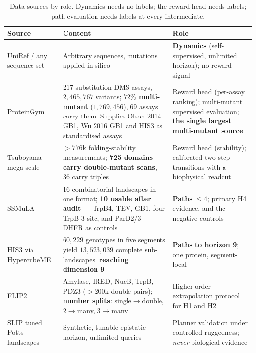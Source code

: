 \documentclass[12pt, a4paper]{article}
\begin{document}
\begin{table}[h]
\centering
\caption{Data sources by role. Dynamics needs no labels; the reward head needs labels; path evaluation needs labels at every intermediate.}
\label{tab:data}
\small
\begin{tabular}{p{4.0cm} p{4.8cm} p{4.6cm}}
\toprule
\textbf{Source} & \textbf{Content} & \textbf{Role} \\
\midrule
UniRef / any sequence set & Arbitrary sequences, mutations applied in silico & \textbf{Dynamics} (self-supervised, unlimited horizon); no reward signal \\
\addlinespace
ProteinGym \citep{notin2023proteingym} & 217 substitution DMS assays, $2{,}465{,}767$ variants; \textbf{$72\%$ multi-mutant} ($1{,}769{,}456$), 69 assays carry them. Supplies Olson 2014 GB1, Wu 2016 GB1 and HIS3 as standardised assays & Reward head (per-assay ranking); multi-mutant supervised evaluation; \textbf{the single largest multi-mutant source} \\
\addlinespace
Tsuboyama mega-scale \citep{tsuboyama2023megascale} & ${>}776$k folding-stability measurements; \textbf{725 domains carry double-mutant scans}, 36 carry triples & Reward head (stability); calibrated two-step transitions with a biophysical readout \\
\addlinespace
SSMuLA \citep{li2025ssmula} & 16 combinatorial landscapes in one format; \textbf{10 usable after audit} --- TrpB4, TEV, GB1, four TrpB 3-site, and ParD2/3 + DHFR as controls & \textbf{Paths} $\leq 4$; primary H4 evidence, and the negative controls \\
\addlinespace
HIS3 via HypercubeME \citep{pokusaeva2019his3, esteban2019hypercubeme} & $60{,}229$ genotypes in five segments yield $13{,}523{,}039$ complete sub-landscapes, \textbf{reaching dimension 9} & \textbf{Paths to horizon 9}; one protein, segment-local \\
\addlinespace
FLIP2 \citep{dallago2021flip} & Amylase, IRED, NucB, TrpB, PDZ3 ($>$200k double pairs); \textbf{number splits}: single$\to$double, 2$\to$many, 3$\to$many & Higher-order extrapolation protocol for H1 and H2 \\
\addlinespace
SLIP tuned Potts landscapes \citep{thomas2022slip} & Synthetic, tunable epistatic horizon, unlimited queries & Planner validation under controlled ruggedness; \textit{never} biological evidence \\
\bottomrule
\end{tabular}
\end{table}
\end{document}
